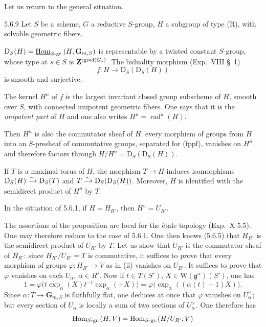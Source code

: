 Let us return to the general situation.
\begin{proposition}{5.6.9}\label{XXII.5.6.9}
Let $S$ be a scheme, $G$ a reductive $S$-group, $H$ a subgroup of type (R), with solvable geometric fibers.
\begin{enumeratei}
\item $\mathrm D_S(H)=\underline{\operatorname{Hom}}_{S\text{-gr.}}(H,\mathbf G_{m,S})$ is representable by a twisted constant $S$-group, whose type at $s\in S$ is $\mathbf{Z}^{\operatorname{rgred}(G_s)}$. The biduality morphism (Exp.~VIII \S~1)
\[
f:H\to\mathrm D_S(\mathrm D_S(H))
\]
is smooth and surjective.
\item The kernel $H^u$ of $f$ is the largest invariant closed group subscheme of $H$, smooth over $S$, with connected unipotent geometric fibers. One says that it is the \emph{unipotent part} of $H$ and one also writes $H^u=\operatorname{rad}^u(H)$.

Then $H^u$ is also the commutator sheaf of $H$: every morphism of groups from $H$ into an $S$-presheaf of commutative groups, separated for (fppf), vanishes on $H^u$ and therefore factors through $H/H^u=\mathrm D_S(\mathrm D_S(H))$.
\item If $T$ is a maximal torus of $H$, the morphism $T\to H$ induces isomorphisms $\mathrm D_S(H)\xrightarrow{\sim}\mathrm D_S(T)$ and $T\xrightarrow{\sim}\mathrm D_S(\mathrm D_S(H))$. Moreover, $H$ is identified with the semidirect product of $H^u$ by $T$.
\item In the situation of 5.6.1, if $H=H_{R'}$, then $H^u=U_{R'}$.
\end{enumeratei}
\end{proposition}
The assertions of the proposition are local for the \'etale topology (Exp.~X 5.5). One may therefore reduce to the case of 5.6.1. One then knows (5.6.5) that $H_{R'}$ is the semidirect product of $U_{R'}$ by $T$. Let us show that $U_{R'}$ is the commutator sheaf of $H_{R'}$: since $H_{R'}/U_{R'}=T$ is commutative, it suffices to prove that every morphism of groups $\varphi:H_{R'}\to V$ as in (ii) vanishes on $U_{R'}$. It suffices to prove that $\varphi$ vanishes on each $U_\alpha$, $\alpha\in R'$. Now if $t\in T(S')$, $X\in\mathrm W(\mathfrak g^\alpha)(S')$, one has
\[
1=\varphi\bigl(t\exp_\alpha(X)t^{-1}\exp_\alpha(-X)\bigr)=\varphi\bigl(\exp_\alpha((\alpha(t)-1)X)\bigr).
\]
Since $\alpha:T\to\mathbf G_{m,S}$ is faithfully flat, one deduces at once that $\varphi$ vanishes on $U_\alpha^\times$; but every section of $U_\alpha$ is locally a sum of two sections of $U_\alpha^\times$. One therefore has
\[
\operatorname{Hom}_{S\text{-gr.}}(H,V)=\operatorname{Hom}_{S\text{-gr.}}(H/U_{R'},V)
\]
